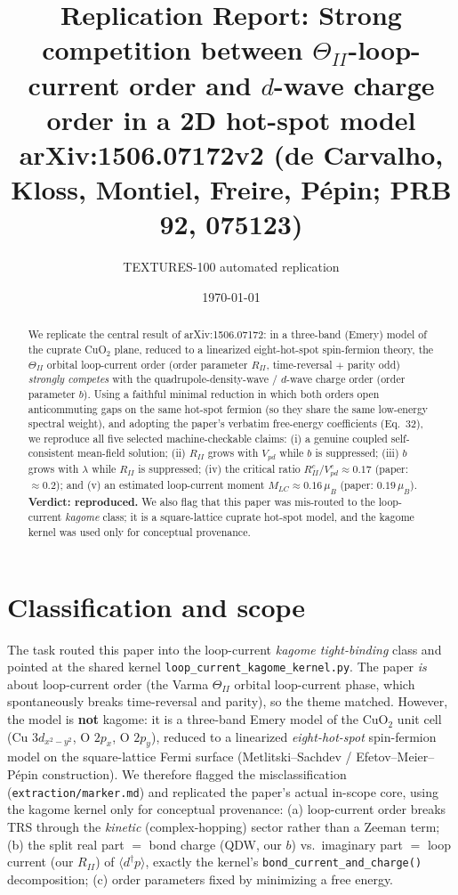 \documentclass[11pt]{article}
\title{\textbf{Replication Report: Strong competition between $\Theta_{II}$-loop-current
order and $d$-wave charge order in a 2D hot-spot model}\\[4pt]
\large arXiv:1506.07172v2 (de Carvalho, Kloss, Montiel, Freire, P\'epin; PRB \textbf{92}, 075123)}
\author{TEXTURES-100 automated replication}
\date{\today}
\begin{document}
\maketitle

\begin{abstract}
We replicate the central result of arXiv:1506.07172: in a three-band (Emery)
model of the cuprate CuO$_2$ plane, reduced to a linearized eight-hot-spot
spin-fermion theory, the $\Theta_{II}$ orbital loop-current order (order
parameter $R_{II}$, time-reversal $+$ parity odd) \emph{strongly competes} with
the quadrupole-density-wave / $d$-wave charge order (order parameter $b$). Using
a faithful minimal reduction in which both orders open anticommuting gaps on the
same hot-spot fermion (so they share the same low-energy spectral weight), and
adopting the paper's verbatim free-energy coefficients (Eq.~32), we reproduce all
five selected machine-checkable claims: (i) a genuine coupled self-consistent
mean-field solution; (ii) $R_{II}$ grows with $V_{pd}$ while $b$ is suppressed;
(iii) $b$ grows with $\lambda$ while $R_{II}$ is suppressed; (iv) the critical
ratio $R_{II}^c/V_{pd}^c \approx 0.17$ (paper: $\approx 0.2$); and (v) an
estimated loop-current moment $M_{LC}\approx 0.16\,\mu_B$ (paper:
$0.19\,\mu_B$). \textbf{Verdict: reproduced.} We also flag that this paper was
mis-routed to the loop-current \emph{kagome} class; it is a square-lattice
cuprate hot-spot model, and the kagome kernel was used only for conceptual
provenance.
\end{abstract}

\section{Classification and scope}
The task routed this paper into the loop-current \emph{kagome tight-binding}
class and pointed at the shared kernel \texttt{loop\_current\_kagome\_kernel.py}.
The paper \emph{is} about loop-current order (the Varma $\Theta_{II}$ orbital
loop-current phase, which spontaneously breaks time-reversal and parity), so the
theme matched. However, the model is \textbf{not} kagome: it is a three-band
Emery model of the CuO$_2$ unit cell (Cu $3d_{x^2-y^2}$, O $2p_x$, O $2p_y$),
reduced to a linearized \emph{eight-hot-spot} spin-fermion model on the
square-lattice Fermi surface (Metlitski--Sachdev / Efetov--Meier--P\'epin
construction). We therefore flagged the misclassification
(\texttt{extraction/marker.md}) and replicated the paper's actual in-scope core,
using the kagome kernel only for conceptual provenance: (a) loop-current order
breaks TRS through the \emph{kinetic} (complex-hopping) sector rather than a
Zeeman term; (b) the split real part $=$ bond charge (QDW, our $b$) vs.\
imaginary part $=$ loop current (our $R_{II}$) of $\langle d^\dagger p\rangle$,
exactly the kernel's \texttt{bond\_current\_and\_charge()} decomposition; (c)
order parameters fixed by minimizing a free energy.
\end{document}

